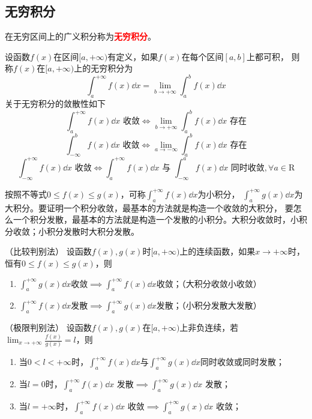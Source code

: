 \subsection{无穷积分}
在无穷区间上的广义积分称为\textcolor{red}{\textsf{\textbf{无穷积分}}}。
\begin{definition}
    设函数$f(x)$在区间$[a,+\infty)$有定义，如果$f(x)$在每个区间$[a,b]$上都可积，
    则称$f(x)$在$[a,+\infty)$上的无穷积分为
    \[ \int_a^{+\infty} f(x)\dd{x} = \lim_{b\to +\infty}\int_a^bf(x)\dd{x} \]
    关于无穷积分的敛散性如下
    \[ \int_a^{+\infty} f(x)\dd{x}\text{ 收敛}\iff \lim_{b\to +\infty}\int_a^bf(x)\dd{x}\text{ 存在} \]
    \[ \int_{-\infty}^b f(x)\dd{x}\text{ 收敛}\iff \lim_{a\to -\infty}\int_a^bf(x)\dd{x}\text{ 存在} \]
    \[ \int_{-\infty}^{+\infty} f(x)\dd{x}\text{ 收敛} \iff  \int_a^{+\infty} f(x)\dd{x}\text{ 与 }\int_{-\infty}^a f(x)\dd{x}\text{ 同时收敛}, \forall a\in\mathrm{R} \]
\end{definition}
按照不等式$0\leq f(x)\leq g(x)$，可称$\displaystyle\int_a^{+\infty}f(x)\dd{x}$为小积分，
$\displaystyle\int_a^{+\infty}g(x)\dd{x}$为大积分。要证明一个积分收敛，最基本的方法就是构造一个收敛的大积分，
要怎么一个积分发散，最基本的方法就是构造一个发散的小积分。大积分收敛时，小积分收敛；小积分发散时大积分发散。

\begin{theorem}
    （比较判别法）
    \label{th:无穷积分比较判别法}
    设函数$f(x),g(x)$时$[a,+\infty)$上的连续函数，如果$x\to+\infty$时，恒有$0\leq f(x) \leq g(x)$，则
    \begin{enumerate}[(1)]
        \item $\displaystyle\int_a^{+\infty} g(x)\dd{x}$收敛$\displaystyle\implies\int_a^{+\infty}f(x)\dd{x}$收敛；（大积分收敛小收敛）
        \item $\displaystyle\int_a^{+\infty} f(x)\dd{x}$发散$\displaystyle\implies\int_a^{+\infty}g(x)\dd{x}$发散；（小积分发散大发散）
    \end{enumerate}
\end{theorem}

\begin{theorem}
    （极限判别法）
    \label{th:无穷积分极限判别法}
    设函数$f(x),g(x)$在$[a,+\infty)$上非负连续，若$\displaystyle\lim_{x\to+\infty}\frac{f(x)}{g(x)}=l$，则
    \begin{enumerate}[(1)]
        \item 当$0<l<+\infty$时，$\displaystyle\int_a^{+\infty}f(x)\dd{x}\text{与}\int_a^{+\infty}g(x)\dd{x}$同时收敛或同时发散；
        \item 当$l=0$时，$\displaystyle\int_a^{+\infty}f(x)\dd{x}\text{ 发散}\implies\int_a^{+\infty}g(x)\dd{x}\text{ 发散}$；
        \item 当$l=+\infty$时，$\displaystyle\int_a^{+\infty}f(x)\dd{x}\text{ 收敛}\implies\int_a^{+\infty}g(x)\dd{x}\text{ 收敛}$；
    \end{enumerate}
\end{theorem}

